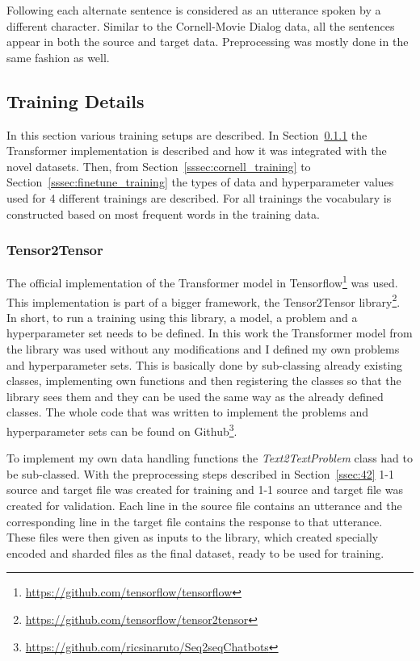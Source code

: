 \documentclass[12pt]{article}
\begin{document}
Following \cite{Vinyals:2015} each alternate sentence is considered as an utterance spoken by a different character. Similar to the Cornell-Movie Dialog data, all the sentences appear in both the source and target data. Preprocessing was mostly done in the same fashion as well.

\subsection{Training Details} \label{ssec:43}
In this section various training setups are described. In Section~\ref{sssec:t2t} the Transformer implementation is described and how it was integrated with the novel datasets. Then, from Section~\ref{sssec:cornell_training} to Section~\ref{sssec:finetune_training} the types of data and hyperparameter values used for 4 different trainings are described. For all trainings the vocabulary is constructed based on most frequent words in the training data.

\subsubsection{Tensor2Tensor} \label{sssec:t2t}
The official implementation of the Transformer model in Tensorflow\footnote{\url{https://github.com/tensorflow/tensorflow}} was used. This implementation is part of a bigger framework, the Tensor2Tensor library\footnote{\url{https://github.com/tensorflow/tensor2tensor}}. In short, to run a training using this library, a model, a problem and a hyperparameter set needs to be defined. In this work the Transformer model from the library was used without any modifications and I defined my own problems and hyperparameter sets. This is basically done by sub-classing already existing classes, implementing own functions and then registering the classes so that the library sees them and they can be used the same way as the already defined classes. The whole code that was written to implement the problems and hyperparameter sets can be found on Github\footnote{\url{https://github.com/ricsinaruto/Seq2seqChatbots}}.

To implement my own data handling functions the \textit{Text2TextProblem} class had to be sub-classed. With the preprocessing steps described in Section~\ref{ssec:42} 1-1 source and target file was created for training and 1-1 source and target file was created for validation. Each line in the source file contains an utterance and the corresponding line in the target file contains the response to that utterance. These files were then given as inputs to the library, which created specially encoded and sharded files as the final dataset, ready to be used for training.
\end{document}
